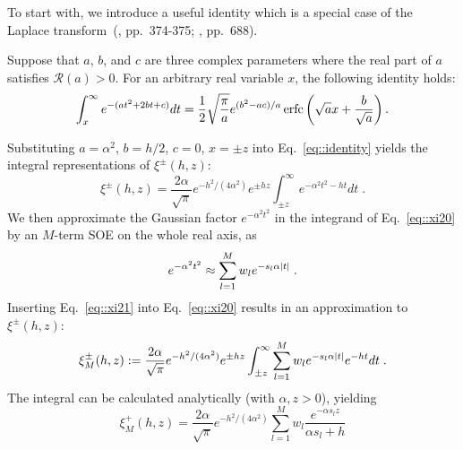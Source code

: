 To start with, we introduce a useful identity which is a special case of the Laplace transform~(\cite{oberhettinger2012tables}, pp.~374-375; \cite{myint2007linear}, pp.~688). 
\begin{lem}
	Suppose that $a$, $b$, and $c$ are three complex parameters where the real part of $a$ satisfies $\mathscr{R}(a)>0$. For an arbitrary real variable $x$, the following identity holds:
	\begin{equation}\label{eq::identity}
		\int_{x}^{\infty} e^{-(at^2+2bt+c)}dt=\frac{1}{2}\sqrt{\frac{\pi}{a}}e^{(b^2-ac)/a}\operatorname{erfc}\left(\sqrt{a}x+\frac{b}{\sqrt{a}}\right).
	\end{equation}
\end{lem}

Substituting $a=\alpha^2$, $b=h/2$, $c=0$, $x=\pm z$ into Eq.~\eqref{eq::identity} yields the integral representations of $\xi^{\pm}(h,z)$:
\begin{equation}\label{eq::xi20}
	\xi^{\pm}(h,z) = \frac{2\alpha}{\sqrt{\pi}}e^{-h^2/(4\alpha^2)}e^{\pm hz}\int_{\pm z}^{\infty}e^{-\alpha^2t^2-ht} dt \;.
\end{equation}
We then approximate the Gaussian factor $e^{-\alpha^2t^2}$ in the integrand of Eq.~\eqref{eq::xi20} by an $M$-term SOE on the whole real axis, as
\begin{equation}\label{eq::xi21}
	e^{-\alpha^2 t^2} \approx \sum_{l = 1}^M w_{l} e^{ - s_{l} \alpha \lvert t\rvert}\;.
\end{equation}
Inserting Eq.~\eqref{eq::xi21} into Eq.~\eqref{eq::xi20} results in an approximation to $\xi^{\pm}(h,z)$:
\begin{equation}\label{eq::xi_M_int}
	\xi_{M}^{\pm}(h, z) := \frac{2\alpha}{\sqrt{\pi}} e^{-h^2/(4\alpha^2)} e^{\pm hz} \int_{\pm z}^{\infty} \sum_{l = 1}^M w_{l} e^{ - s_{l} \alpha \lvert t\rvert} e^{-ht} dt \;.
\end{equation}
The integral can be calculated analytically (with $\alpha, z > 0$), yielding 
\begin{equation}\label{eq::plus}
	\xi_M^{+}(h,z) = \frac{2 \alpha}{\sqrt{\pi}} e^{-h^2/(4 \alpha^2)} \sum_{l = 1}^M w_l\frac{e^{- \alpha s_l z}}{\alpha s_l + h } 
\end{equation}
